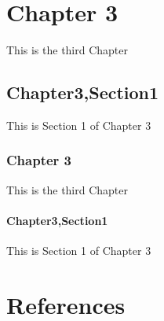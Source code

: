 \documentclass[letterpaper,10pt,english]{sphinxmanual}
\begin{document}
\section{Chapter 3}
\label{\detokenize{chapter3:chapter-3}}\label{\detokenize{chapter3::doc}}
This is the third Chapter


\subsection{Chapter3,Section1}
\label{\detokenize{chapter3:chapter3-section1}}
This is Section 1 of Chapter 3


\subsubsection{Chapter 3}
\label{\detokenize{chapter3section2:chapter-3}}\label{\detokenize{chapter3section2::doc}}
This is the third Chapter


\paragraph{Chapter3,Section1}
\label{\detokenize{chapter3section2:chapter3-section1}}
This is Section 1 of Chapter 3


\section{References}
\label{\detokenize{references:references}}\label{\detokenize{references::doc}}








\renewcommand{\indexname}{Index}
\printindex
\end{document}
